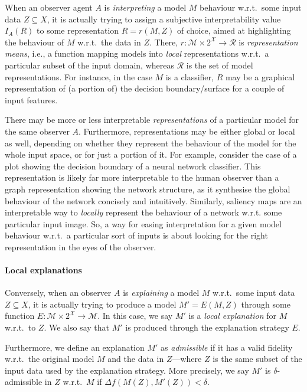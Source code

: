 \documentclass[12pt,a4paper,openright,twoside]{book}
\begin{document}
When an observer agent $A$ is \emph{interpreting} a model $M$ behaviour w.r.t.\ some input data $Z \subseteq X$, it is actually trying to assign a subjective interpretability value $I_A(R)$ to some representation $R = r(M, Z)$ of choice, aimed at highlighting the behaviour of $M$ w.r.t.\ the data in $Z$.
%
There, $r : \mathcal{M} \times 2^\mathcal{X} \rightarrow \mathcal{R}$ is \emph{representation means}, i.e., a function mapping models into \emph{local} representations w.r.t.\ a particular subset of the input domain, whereas $\mathcal{R}$ is the set of model representations.
%
For instance, in the case $M$ is a classifier, $R$ may be a graphical representation of (a portion of) the decision boundary/surface for a couple of input features.

There may be more or less interpretable \emph{representations} of a particular model for the same observer $A$.
%
Furthermore, representations may be either global or local as well, depending on whether they represent the behaviour of the model for the whole input space, or for just a portion of it.
%
For example, consider the case of a plot showing the decision boundary of a neural network classifier.
%
This representation is likely far more interpretable to the human observer than a graph representation showing the network structure, as it synthesise the global behaviour of the network concisely and intuitively.
%
Similarly, saliency maps are an interpretable way to \emph{locally} represent the behaviour of a network w.r.t. some particular input image.
%
So, a way for easing interpretation for a given model behaviour w.r.t.\ a particular sort of inputs is about looking for the right representation in the eyes of the observer.

\paragraph{Local explanations}

Conversely, when an observer $A$ is \emph{explaining} a model $M$ w.r.t.\ some input data $Z \subseteq X$, it is actually trying to produce a model $M' = E(M, Z)$ through some function $E: \mathcal{M} \times 2^\mathcal{X} \rightarrow \mathcal{M}$.
%
In this case, we say $M'$ is a \emph{local explanation} for $M$ w.r.t.\ to $Z$.
%
We also say that $M'$ is produced through the explanation strategy $E$.

Furthermore, we define an explanation $M'$ as \emph{admissible} if it has a valid fidelity w.r.t.\ the original model $M$ and the data in $Z$---where $Z$ is the same subset of the input data used by the explanation strategy.
%
More precisely, we say $M'$ is $\delta$-admissible in $Z$ w.r.t.\ $M$ if $\Delta f(M(Z), M'(Z)) < \delta$.
\end{document}
